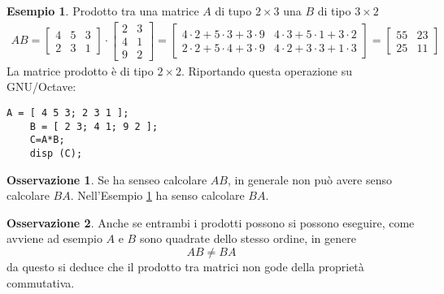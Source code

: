 \documentclass{book}
\theoremstyle{definition}
\newtheorem{es}{Esempio}[section]
\newtheorem{oss}{Osservazione}[section]
\theoremstyle{plain}
\begin{document}
\begin{es}
  \label{es:prodmtxrigcol1}
  Prodotto tra una matrice $A$ di tupo $2\times 3$ una $B$ di tipo $3\times 2$
  \begin{eqnarray*}
    AB=
    \begin{bmatrix}
      4 & 5 & 3 \\
      2 & 3 & 1
    \end{bmatrix}\cdot
    \begin{bmatrix}
      2 & 3 \\
      4 & 1 \\
      9 & 2
    \end{bmatrix} =
    \begin{bmatrix}
      4\cdot 2 + 5 \cdot 3 + 3\cdot 9 & 4 \cdot 3 + 5 \cdot 1 + 3 \cdot 2\\
      2\cdot 2 + 5 \cdot 4 + 3\cdot 9 & 4 \cdot 2 + 3 \cdot 3 + 1 \cdot 3
    \end{bmatrix}
    =
    \begin{bmatrix}
      55 & 23\\
      25 & 11
    \end{bmatrix}
  \end{eqnarray*}
  La matrice prodotto è di tipo $2\times 2$. Riportando questa operazione su
  GNU/Octave:
  \begin{lstlisting}[caption=moltiplicazione riga per colonna]
    A = [ 4 5 3; 2 3 1 ];
    B = [ 2 3; 4 1; 9 2 ];
    C=A*B;
    disp (C);
  \end{lstlisting}
\end{es}
\begin{oss}
  \label{oss:prodmtxrigcol1}
  Se ha senseo calcolare $AB$, in generale non può avere senso calcolare $BA$.
  Nell'Esempio \ref{es:prodmtxrigcol1} ha senso calcolare $BA$. 
\end{oss}
\begin{oss}
  \label{oss:prodmtxrigcol2}
  Anche se entrambi i prodotti possono si possono eseguire, come avviene ad
  esempio $A$ e $B$ sono quadrate dello stesso ordine, in genere
  \begin{equation*}
    AB\neq BA
  \end{equation*}
  da questo si deduce che il prodotto tra matrici non gode della proprietà
  commutativa.
\end{oss}
\end{document}
